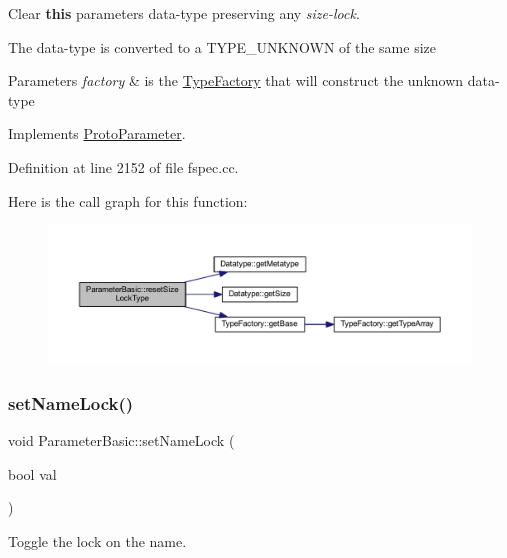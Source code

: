 Clear {\bfseries{this}} parameter\textquotesingle{}s data-\/type preserving any {\itshape size-\/lock}. 

The data-\/type is converted to a T\+Y\+P\+E\+\_\+\+U\+N\+K\+N\+O\+WN of the same size 
\begin{DoxyParams}{Parameters}
{\em factory} & is the \mbox{\hyperlink{class_type_factory}{Type\+Factory}} that will construct the unknown data-\/type \\
\hline
\end{DoxyParams}


Implements \mbox{\hyperlink{class_proto_parameter_a15d92b3da7ab6b1cd6cf52dea6ee2978}{Proto\+Parameter}}.



Definition at line 2152 of file fspec.\+cc.

Here is the call graph for this function\+:
\nopagebreak
\begin{figure}[H]
\begin{center}
\leavevmode
\includegraphics[width=350pt]{class_parameter_basic_ac3aed750efa13f72a9a674ceb666eb9a_cgraph}
\end{center}
\end{figure}
\mbox{\label{class_parameter_basic_aad8993c75874c7ac36c92ce51f05434a}} 
\subsubsection{\texorpdfstring{setNameLock()}{setNameLock()}}
{\footnotesize\ttfamily void Parameter\+Basic\+::set\+Name\+Lock (\begin{DoxyParamCaption}\item[{bool}]{val }\end{DoxyParamCaption})\hspace{0.3cm}{\ttfamily [virtual]}}



Toggle the lock on the name. 



